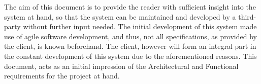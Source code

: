 The aim of this document is to provide the reader with sufficient insight into the system at hand, so that the system can be maintained and developed by a third-party without further input needed. The initial development of this system made use of agile software development, and thus, not all specifications, as provided by the client, is known beforehand. The client, however will form an integral part in the constant development of this system due to the aforementioned reasons. This document, acts as an initial impression of the Architectural and Functional requirements for the project at hand.